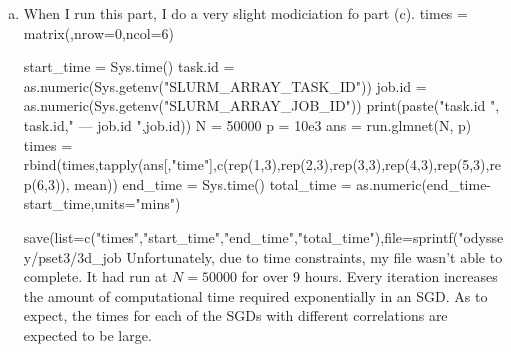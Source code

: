 \documentclass[letterpaper,10pt]{amsart}
\newenvironment{verbatimcode}{\bigskip \scriptsize \verbatim}{\endverbatim \normalsize \bigskip}
\begin{document}
\begin{enumerate}[1.]
\begin{enumerate}[(a)]
\item 
When I run this part, I do a very slight modiciation fo part (c). 
\begin{verbatimcode}
times = matrix(,nrow=0,ncol=6)

start_time = Sys.time()
task.id = as.numeric(Sys.getenv("SLURM_ARRAY_TASK_ID"))
job.id = as.numeric(Sys.getenv("SLURM_ARRAY_JOB_ID"))
print(paste("task.id ", task.id,"   ---  job.id  ",job.id))
N = 50000
p = 10e3
ans = run.glmnet(N, p)
times = rbind(times,tapply(ans[,"time"],c(rep(1,3),rep(2,3),rep(3,3),rep(4,3),rep(5,3),rep(6,3)), mean))
end_time = Sys.time()
total_time = as.numeric(end_time-start_time,units="mins")

save(list=c("times","start_time","end_time","total_time"),file=sprintf("odyssey/pset3/3d_job%
\end{verbatimcode}
Unfortunately, due to time constraints, my file wasn't able to complete. It had run at $N=50000$ for over 9 hours. Every iteration increases the amount of computational time required exponentially in an SGD. As to expect, the times for each of the SGDs with different correlations are expected to be large. 
\end{enumerate}

\end{enumerate}
\end{document}
